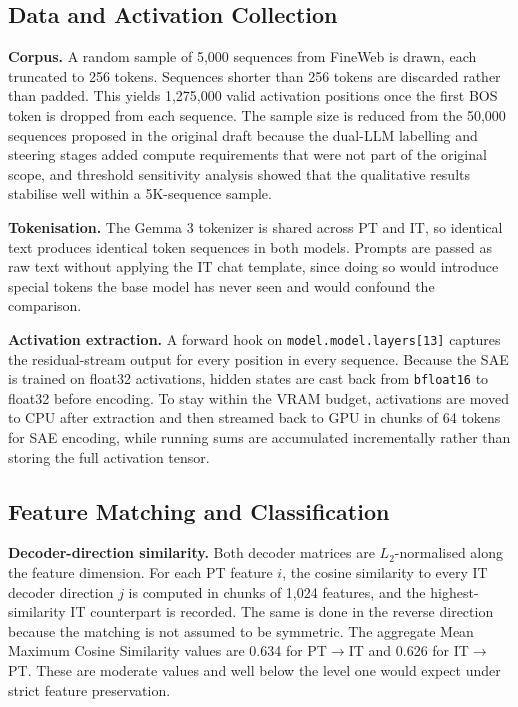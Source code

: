 \subsection{Data and Activation Collection}
\label{subsec:data-activation}

\textbf{Corpus.} A random sample of 5,000 sequences from FineWeb is drawn, each truncated to 256 tokens. Sequences shorter than 256 tokens are discarded rather than padded. This yields 1,275,000 valid activation positions once the first BOS token is dropped from each sequence. The sample size is reduced from the 50,000 sequences proposed in the original draft because the dual-LLM labelling and steering stages added compute requirements that were not part of the original scope, and threshold sensitivity analysis showed that the qualitative results stabilise well within a 5K-sequence sample.

\textbf{Tokenisation.} The Gemma 3 tokenizer is shared across PT and IT, so identical text produces identical token sequences in both models. Prompts are passed as raw text without applying the IT chat template, since doing so would introduce special tokens the base model has never seen and would confound the comparison.

\textbf{Activation extraction.} A forward hook on \texttt{model.model.layers[13]} captures the residual-stream output for every position in every sequence. Because the SAE is trained on float32 activations, hidden states are cast back from \texttt{bfloat16} to float32 before encoding. To stay within the VRAM budget, activations are moved to CPU after extraction and then streamed back to GPU in chunks of 64 tokens for SAE encoding, while running sums are accumulated incrementally rather than storing the full activation tensor.

\subsection{Feature Matching and Classification}
\label{subsec:feature-matching}

\textbf{Decoder-direction similarity.} Both decoder matrices are $L_2$-normalised along the feature dimension. For each PT feature $i$, the cosine similarity to every IT decoder direction $j$ is computed in chunks of 1,024 features, and the highest-similarity IT counterpart is recorded. The same is done in the reverse direction because the matching is not assumed to be symmetric. The aggregate Mean Maximum Cosine Similarity values are 0.634 for PT$\rightarrow$IT and 0.626 for IT$\rightarrow$PT. These are moderate values and well below the level one would expect under strict feature preservation.

